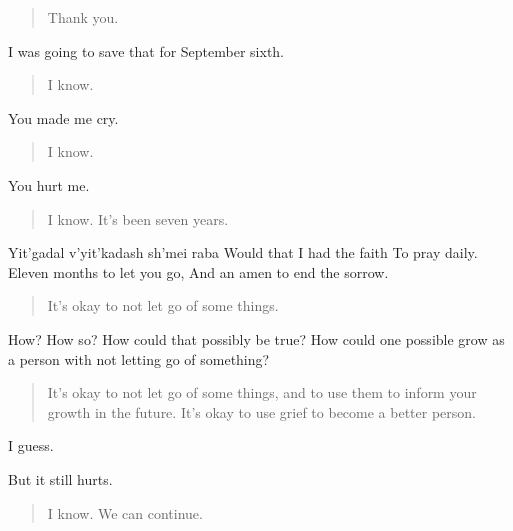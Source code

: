 \begin{quote}
Thank you.
\end{quote}

I was going to save that for September sixth.

\begin{quote}
I know.
\end{quote}

You made me cry.

\begin{quote}
I know.
\end{quote}

You hurt me.

\begin{quote}
I know. It's been seven years.
\end{quote}

Yit'gadal v'yit'kadash sh'mei raba Would that I had the faith To pray daily. Eleven months to let you go, And an amen to end the sorrow.

\begin{quote}
It's okay to not let go of some things.
\end{quote}

How? How so? How could that possibly be true? How could one possible grow as a person with not letting go of something?

\begin{quote}
It's okay to not let go of some things, and to use them to inform your growth in the future. It's okay to use grief to become a better person.
\end{quote}

I guess.

But it still hurts.

\begin{quote}
I know. We can continue.
\end{quote}
